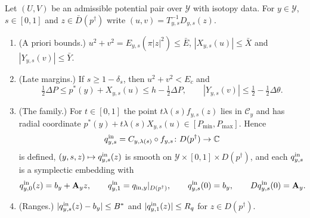 \begin{proposition}\label{prop:pln-inner-family}
Let $(U,V)$ be an admissible potential pair over $\mathcal Y$ with isotopy data. For $y\in\mathcal Y$, $s\in[0,1]$ and
$z\in\bar D(p^\dagger)$ write $(u,v)=T_{y,s}^{-1}D_{y,s}(z)$.
\begin{enumerate}[label=(\alph*)]
\item (A priori bounds.) $u^2+v^2=E_{y,s}(\pi|z|^2)\le\bar E$, $|X_{y,s}(u)|\le\bar X$ and $|Y_{y,s}(v)|\le\bar Y$.
\item (Late margins.) If $s\ge1-\delta_s$, then $u^2+v^2<E_c$ and
 \[
  \tfrac12\Delta P\le p^*(y)+X_{y,s}(u)\le h-\tfrac12\Delta P,\qquad |Y_{y,s}(v)|\le\tfrac12-\tfrac12\Delta\theta .
 \]
\item (The family.) For $t\in[0,1]$ the point $t\lambda(s)f_{y,s}(z)$ lies in $\mathcal C_y$ and has radial coordinate
 $p^*(y)+t\lambda(s)X_{y,s}(u)\in[P_{\min},P_{\max}]$. Hence
 \[
  q^{\rm in}_{y,s}=C_{y,\lambda(s)}\circ f_{y,s}\colon D(p^\dagger)\to\mathbb{C}
 \]
 is defined, $(y,s,z)\mapsto q^{\rm in}_{y,s}(z)$ is smooth on $\mathcal Y\times[0,1]\times D(p^\dagger)$, and each
 $q^{\rm in}_{y,s}$ is a symplectic embedding with
 \[
  q^{\rm in}_{y,0}(z)=b_y+\mathbf A_yz,\qquad q^{\rm in}_{y,1}=q_{{\rm in},y}|_{D(p^\dagger)},\qquad
  q^{\rm in}_{y,s}(0)=b_y,\qquad Dq^{\rm in}_{y,s}(0)=\mathbf A_y .
 \]
\item (Ranges.) $|q^{\rm in}_{y,s}(z)-b_y|\le B^*$ and $|q^{\rm in}_{y,1}(z)|\le R_q$ for $z\in D(p^\dagger)$.
\end{enumerate}
\end{proposition}

